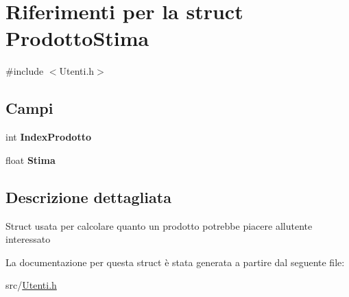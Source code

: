 \hypertarget{struct_prodotto_stima}{}\section{Riferimenti per la struct Prodotto\+Stima}
\label{struct_prodotto_stima}


{\ttfamily \#include $<$Utenti.\+h$>$}

\subsection*{Campi}
\begin{DoxyCompactItemize}
\item 
\mbox{\label{struct_prodotto_stima_ada0a8640703dc9b3659ba1e61befebeb}} 
int {\bfseries Index\+Prodotto}
\item 
\mbox{\label{struct_prodotto_stima_a458d8b74627b0bb00540f251f068a96c}} 
float {\bfseries Stima}
\end{DoxyCompactItemize}


\subsection{Descrizione dettagliata}
Struct usata per calcolare quanto un prodotto potrebbe piacere all\textquotesingle{}utente interessato 

La documentazione per questa struct è stata generata a partire dal seguente file\+:\begin{DoxyCompactItemize}
\item 
src/\hyperlink{_utenti_8h}{Utenti.\+h}\end{DoxyCompactItemize}
